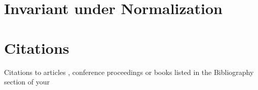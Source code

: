 \documentclass{sig-alternate}
\begin{document}
\section{Invariant under Normalization}
\section{Citations}
    Citations to articles \cite{bowman:reasoning,
    clark:pct, braams:babel, herlihy:methodology},
    conference proceedings \cite{clark:pct} or
    books \cite{salas:calculus, Lamport:LaTeX} listed
    in the Bibliography section of your

 
\end{document}
